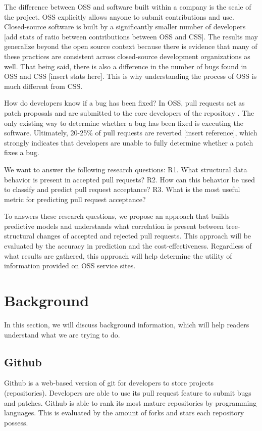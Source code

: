 \documentclass[10pt, conference]{IEEEtran}
\begin{document}
The difference between OSS and software built within a company is the scale of the project. OSS explicitly allows anyone to submit contributions and use. Closed-source software is built by a significantly smaller number of developers [add stats of ratio between contributions between OSS and CSS]. The results may generalize beyond the open source context because there is evidence that many of these practices are consistent across closed-source development organizations as well. That being said, there is also a difference in the number of bugs found in OSS and CSS [insert stats here]. This is why understanding the process of OSS is much different from CSS.

How do developers know if a bug has been fixed? In OSS, pull requests act as patch proposals and are submitted to the core developers of the repository \cite{IEEEhowto:kopka}. The only existing way to determine whether a bug has been fixed is executing the software. Ultimately, 20-25\% of pull requests are reverted [insert reference], which strongly indicates that developers are unable to fully determine whether a patch fixes a bug.

We want to answer the following research questions:
R1. What structural data behavior is present in accepted pull requests?
R2. How can this behavior be used to classify and predict pull request acceptance?
R3. What is the most useful metric for predicting pull request acceptance?

To answers these research questions, we propose an approach that builds predictive models and understands what correlation is present between tree-structural changes of accepted and rejected pull requests. This approach will be evaluated by the accuracy in prediction and the cost-effectiveness. Regardless of what results are gathered, this approach will help determine the utility of information provided on OSS service sites.

\section{Background}
In this section, we will discuss background information, which will help readers understand what we are trying to do.

\subsection{Github}
Github is a web-based version of git for developers to store projects (repositories). Developers are able to use its pull request feature to submit bugs and patches. Github is able to rank its most mature repositories by programming languages. This is evaluated by the amount of forks and stars each repository possess. 
\end{document}
